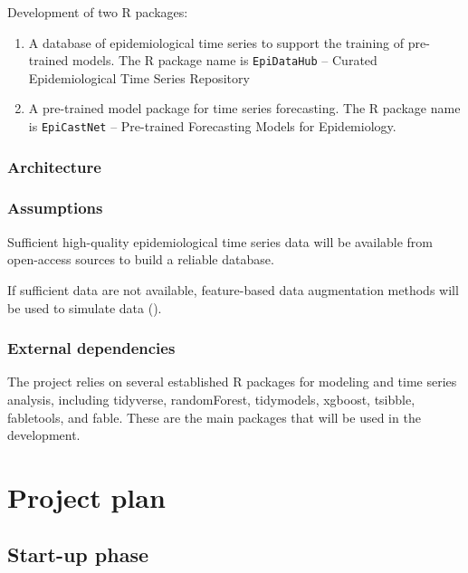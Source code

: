 \documentclass[
]{article}
\begin{document}
Development of two R packages:

\begin{enumerate}
\def\labelenumi{\roman{enumi}.}
\item
  A database of epidemiological time series to support the training of
  pre-trained models. The R package name is \texttt{EpiDataHub} --
  Curated Epidemiological Time Series Repository
\item
  A pre-trained model package for time series forecasting. The R package
  name is \texttt{EpiCastNet} -- Pre-trained Forecasting Models for
  Epidemiology.
\end{enumerate}

\subsubsection{Architecture}\label{architecture}

\subsubsection{Assumptions}\label{assumptions}

Sufficient high-quality epidemiological time series data will be
available from open-access sources to build a reliable database.

If sufficient data are not available, feature-based data augmentation
methods will be used to simulate data
().

\subsubsection{External dependencies}\label{external-dependencies}

The project relies on several established R packages for modeling and
time series analysis, including tidyverse, randomForest, tidymodels,
xgboost, tsibble, fabletools, and fable. These are the main packages
that will be used in the development.

\section{Project plan}\label{project-plan}

\subsection{Start-up phase}\label{start-up-phase}
\end{document}
